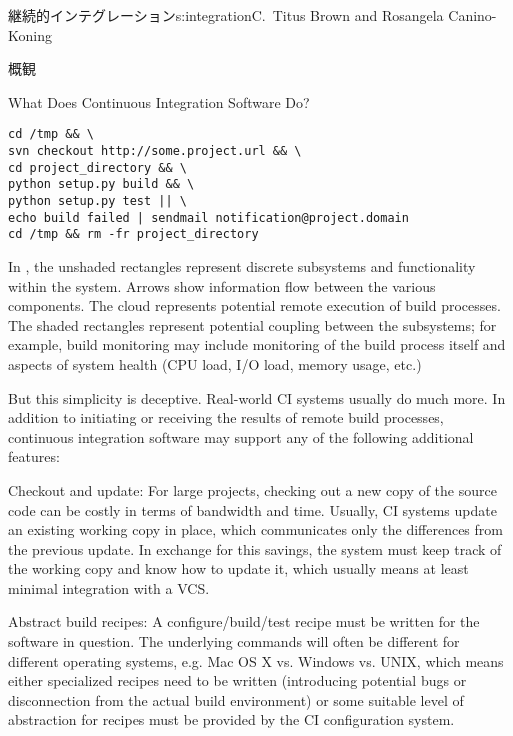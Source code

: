 \begin{aosachapter}{継続的インテグレーション}{s:integration}{C.\ Titus Brown and Rosangela Canino-Koning}
\begin{aosasect1}{概観}
\begin{aosasect2}{What Does Continuous Integration Software Do?}
\begin{verbatim}
cd /tmp && \
svn checkout http://some.project.url && \
cd project_directory && \
python setup.py build && \
python setup.py test || \
echo build failed | sendmail notification@project.domain
cd /tmp && rm -fr project_directory
\end{verbatim}

In , the unshaded rectangles
represent discrete subsystems and functionality within the system.
Arrows show information flow between the various components.  The
cloud represents potential remote execution of build processes.  The
shaded rectangles represent potential coupling between the subsystems;
for example, build monitoring may include monitoring of the build
process itself and aspects of system health (CPU load, I/O load,
memory usage, etc.)


But this simplicity is deceptive. Real-world CI systems usually
do much more. In addition to initiating or receiving the results of
remote build processes, continuous integration software may support
any of the following additional features:

\begin{aosadescription}

  \item{Checkout and update:} For large projects, checking out a
  new copy of the source code can be costly in terms of bandwidth
  and time. Usually, CI systems update an existing working copy in
  place, which communicates only the differences from the previous
  update. In exchange for this savings, the system must keep track
  of the working copy and know how to update it, which usually means
  at least minimal integration with a VCS.

  \item{Abstract build recipes:} A configure/build/test recipe
  must be written for the software in question. The underlying
  commands will often be different for different operating systems,
  e.g. Mac OS X vs. Windows vs. UNIX, which means either specialized
  recipes need to be written (introducing potential bugs or
  disconnection from the actual build environment) or some suitable
  level of abstraction for recipes must be provided by the CI
  configuration system.


\end{aosadescription}
\end{aosasect2}
\end{aosasect1}
\end{aosachapter}
